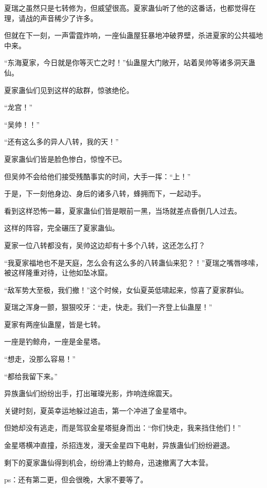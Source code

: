 \begin{this_body}
夏瑞之虽然只是七转修为，但威望很高。夏家蛊仙听了他的这番话，也都觉得在理，请战的声音稀少了许多。

但就在下一刻，一声雷霆炸响，一座仙蛊屋狂暴地冲破界壁，杀进夏家的公共福地中来。

“东海夏家，今日就是你等灭亡之时！”仙蛊屋大门敞开，站着吴帅等诸多洞天蛊仙。

夏家蛊仙们见到这样的敌群，惊骇绝伦。

“龙宫！”

“吴帅！！”

“还有这么多的异人八转，我的天！”

夏家蛊仙们皆是脸色惨白，惊惶不已。

但吴帅不会给他们接受残酷事实的时间，大手一挥：“上！”

于是，下一刻他身边、身后的诸多八转，蜂拥而下，一起动手。

看到这样恐怖一幕，夏家蛊仙们皆是眼前一黑，当场就差点昏倒几人过去。

这样的阵容，完全碾压了夏家蛊仙。

夏家一位八转都没有，吴帅这边却有十多个八转，这还怎么打？

“我夏家福地也不是天庭，怎么会有这么多的八转蛊仙来犯？！”夏瑞之嘴唇哆嗦，被这样隆重对待，让他如坠冰窟。

“敌军势大至极，我们撤！”这个时候，女仙夏英低啸起来，惊喜了夏家群仙。

夏瑞之浑身一颤，狠狠咬牙：“走，快走。我们一齐登上仙蛊屋！”

夏家有两座仙蛊屋，皆是七转。

一座是钓鲸舟，一座是金星塔。

“想走，没那么容易！”

“都给我留下来。”

异族蛊仙们纷纷出手，打出璀璨光影，炸响连绵震天。

关键时刻，夏英幸运地躲过追击，第一个冲进了金星塔中。

但她却没有逃走，而是驾驭金星塔挺身而出：“你们快走，我来挡住他们！”

金星塔横冲直撞，杀招连发，漫天金星四下电射，异族蛊仙们纷纷避退。

剩下的夏家蛊仙得到机会，纷纷涌上钓鲸舟，迅速撤离了大本营。

ps：还有第二更，但会很晚，大家不要等了。

\end{this_body}

